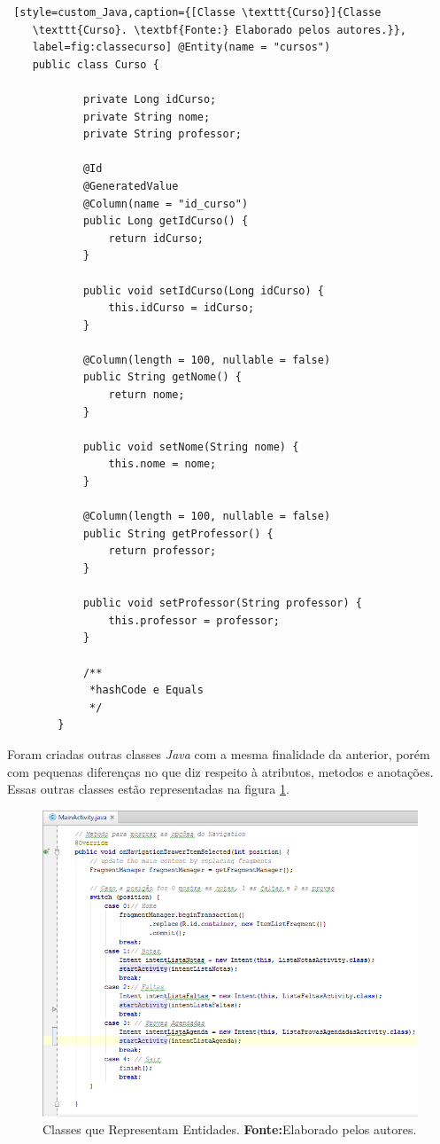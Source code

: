 	\begin{lstlisting} [style=custom_Java,caption={[Classe \texttt{Curso}]{Classe
	\texttt{Curso}. \textbf{Fonte:} Elaborado pelos autores.}},
	label=fig:classecurso] @Entity(name = "cursos") 
	public class Curso {

			private Long idCurso;
			private String nome;
			private String professor;
		
			@Id
			@GeneratedValue
			@Column(name = "id_curso")
			public Long getIdCurso() {
				return idCurso;
			}
		
			public void setIdCurso(Long idCurso) {
				this.idCurso = idCurso;
			}
		
			@Column(length = 100, nullable = false)
			public String getNome() {
				return nome;
			}
		
			public void setNome(String nome) {
				this.nome = nome;
			}
		
			@Column(length = 100, nullable = false)
			public String getProfessor() {
				return professor;
			}
		
			public void setProfessor(String professor) {
				this.professor = professor;
			}
			
			/**
			 *hashCode e Equals
			 */
		}
	\end{lstlisting}
	
		\par Foram criadas outras classes \textit{Java} com a mesma finalidade da
	anterior, porém com pequenas diferenças no que diz respeito à atributos,
	metodos e anotações. Essas outras classes estão representadas na
	figura \ref{fig:otherclass}.
	
		\begin{figure}[h!]
			\centerline{\includegraphics[scale=0.5]{./imagens/imagem6.png}}
			\caption[Classes que Representam Entidades]{Classes que Representam Entidades.
			\textbf{Fonte:}Elaborado pelos autores.}
			\label{fig:otherclass}
		\end{figure}
		
